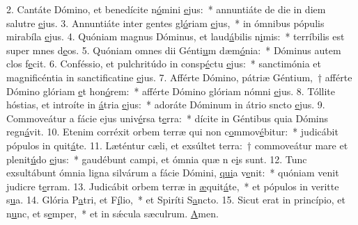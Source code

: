 2. Cantáte Dómino, et benedícite n\uline{ó}mini \uline{e}jus:~* annuntiáte de die in diem salutre \uline{e}jus.
3. Annuntiáte inter gentes gl\uline{ó}riam \uline{e}jus,~* in ómnibus pópulis mirabíla \uline{e}jus.
4. Quóniam magnus Dóminus, et laud\uline{á}bilis n\uline{i}mis:~* terríbilis est super mnes d\uline{e}os.
5. Quóniam omnes dii Génti\uline{u}m dæm\uline{ó}nia:~* Dóminus autem clos f\uline{e}cit.
6. Conféssio, et pulchritúdo in consp\uline{é}ctu \uline{e}jus:~* sanctimónia et magnificéntia in sanctificatine \uline{e}jus.
7. Afférte Dómino, pátriæ Géntium,~† afférte Dómino glóriam \uline{e}t hon\uline{ó}rem:~* afférte Dómino glóriam nómni \uline{e}jus.
8. Tóllite hóstias, et introíte in \uline{á}tria \uline{e}jus:~* adoráte Dóminum in átrio sncto \uline{e}jus.
9. Commoveátur a fácie ejus univ\uline{é}rsa t\uline{e}rra:~* dícite in Géntibus quia Dómins regn\uline{á}vit.
10. Etenim corréxit orbem terræ qui non c\uline{o}mmov\uline{é}bitur:~* judicábit pópulos in quit\uline{á}te.
11. Læténtur cæli, et exsúltet terra:~† commoveátur mare et plenit\uline{ú}do \uline{e}jus:~* gaudébunt campi, et ómnia quæ n e\uline{i}s sunt.
12. Tunc exsultábunt ómnia ligna silvárum a fácie Dómini, \uline{qui}a v\uline{e}nit:~* quóniam venit judicre t\uline{e}rram.
13. Judicábit orbem terræ in \uline{æ}quit\uline{á}te,~* et pópulos in veritte s\uline{u}a.
14. Glória P\uline{a}tri, et F\uline{í}lio,~* et Spiríti S\uline{a}ncto.
15. Sicut erat in princípio, et n\uline{u}nc, et s\uline{e}mper,~* et in sǽcula sæculrum. \uline{A}men.
